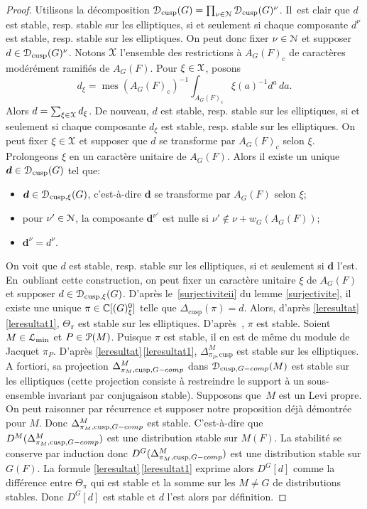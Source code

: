 \documentclass[11pt]{article}
\newcommand{\resp}{resp.\xspace}
\numberwithin{equation}{section}\providecommand{\og}{«\,}\providecommand{\fg}{\,»}
\let\mathcal \EuScript
\newcommand{\NoChangel}[1]{%
\expandafter\let\csname old\string#1\endcsname=#1
\let#1=\relax
\newcommand{#1}{\mathcode`l="716C\csname old\string#1\endcsname\mathcode`l="7160 }%
}
\newcommand{\rc}{\mathrm{c}}
\newcommand{\tcomp}{\textup{-comp}}
\newcommand{\cusp}{\mathrm{cusp}}
\newcommand{\Ell}{\mathrm{Ell}} \NoChangel{\Ell}
\DeclareMathOperator{\mes}{mes}
\newcommand{\bmd}{\boldsymbol{d}}
\newcommand{\cD}{\mathcal{D}}
\newcommand{\cL}{\mathcal{L}}
\newcommand{\cN}{\mathcal{N}}
\newcommand{\cP}{\mathcal{P}}
\newcommand{\cX}{\mathcal{X}}
\newcommand{\CC}{\mathbb{C}}
\theoremstyle{plain}
\theoremstyle{definition}
\begin{document}
\begin{proof}
Utilisons la décomposition $\cD_{\cusp}(G)=\prod_{\nu\in \cN}\cD_{\cusp}(G)^{\nu}$. Il~est clair que $d$ est stable, \resp stable sur les elliptiques, si et seulement si chaque composante $d^{\nu}$ est stable, \resp stable sur les elliptiques. On peut donc fixer $\nu\in \cN$ et supposer $d\in \cD_{\cusp}(G)^{\nu}$. Notons $\cX$ l'ensemble des restrictions à $A_{G}(F)_{\rc}$ de caractères modérément ramifiés de $A_{G}(F)$. Pour $\xi\in \cX$, posons
\[
d_{\xi}=\mes(A_{G}(F)_{\rc})^{-1}\int_{A_{G}(F)_{\rc}}\xi(a)^{-1}{d^{a}}\, da.
\]
Alors $d=\sum_{\xi\in \cX}d_{\xi}$. De nouveau, $d$ est stable, \resp stable sur les elliptiques, si et seulement si chaque composante $d_{\xi}$ est stable, \resp stable sur les elliptiques. On peut fixer $\xi\in \cX$ et supposer que $d$ se transforme par $A_{G}(F)_{\rc}$ selon $\xi$. Prolongeons $\xi$ en un caractère unitaire de $A_{G}(F)$. Alors il existe un unique $\bmd\in \cD_{\cusp}(G)$ tel que:
\begin{itemize}
\item
$\bmd\in \cD_{\cusp,\xi}(G)$, c'est-à-dire $\bmd$ se transforme par $A_{G}(F)$ selon $\xi$;

\item
pour $\nu'\in \cN$, la composante $\bmd^{\nu'}$ est nulle si $\nu'\not\in \nu+w_{G}(A_{G}(F))$;

\item
$\bmd^{\nu}=d^{\nu}$.
\end{itemize}

On voit que $d$ est stable, \resp stable sur les elliptiques, si et seulement si $\bmd$ l'est. En~oubliant cette construction, on peut fixer un caractère unitaire $\xi$ de $A_{G}(F)$ et supposer $d\in \cD_{\cusp,\xi}(G)$. D'après le~\eqref{surjectiviteii} du lemme \ref{surjectivite}, il existe une unique $\pi\in \CC[\Ell(G)_{\xi}^0]$ telle que $\Delta_{\cusp}(\pi)=d$. Alors, d'après \ref{leresultat}\,\eqref{leresultat1}, $\Theta_{\pi}$ est stable sur les \hbox{elliptiques}. D'après~\cite[Th.\,6.1]{A3}, $\pi$ est stable. Soient $M\in \cL_{\min}$ et $P\in \cP(M)$. Puisque $\pi$ est stable, il en est de même du module de Jacquet $\pi_{P}$. D'après
\ref{leresultat}\,\eqref{leresultat1}, $\Delta^M_{\pi_{P},\cusp}$ est stable sur les elliptiques. A fortiori, sa projection $\Delta^M_{\pi_{M},\cusp,G\tcomp}$ dans $\cD_{\cusp,G\tcomp}(M)$ est stable sur les elliptiques (cette projection consiste à restreindre le support à un sous-ensemble invariant par conjugaison stable). Supposons que~$M$ est un Levi propre. On peut raisonner par récurrence et supposer notre proposition déjà démontrée pour $M$. Donc $\Delta^M_{\pi_{M},\cusp,G\tcomp}$ est stable. C'est-à-dire que $D^M(\Delta^M_{\pi_{M},\cusp,G\tcomp})$ est une distribution stable sur $M(F)$. La stabilité se conserve par induction donc $D^G(\Delta^M_{\pi_{M},\cusp,G\tcomp})$ est une distribution stable sur $G(F)$. La formule \ref{leresultat}\,\eqref{leresultat1} exprime alors $D^G[d]$ comme la différence entre $\Theta_{\pi}$ qui est stable et la somme sur les $M\neq G$ de distributions stables. Donc $D^G[d]$ est stable et $d$ l'est alors par définition.
\end{proof}
\end{document}
